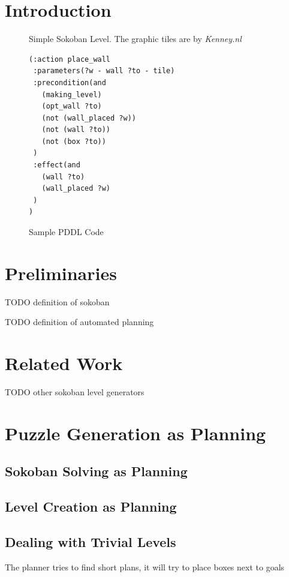 \documentclass[runningheads]{llncs}
\begin{document}
\section{Introduction}

\begin{figure}
\centering
\w\w\w\w\w\w\n
\w\p\e\x\g\w\n
\w\w\w\w\w\w\n
\caption{Simple Sokoban Level. The graphic tiles are by \emph{Kenney.nl}}
\end{figure}

\begin{figure}
\centering
\begin{verbatim}
(:action place_wall
 :parameters(?w - wall ?to - tile)
 :precondition(and
   (making_level)
   (opt_wall ?to)
   (not (wall_placed ?w))
   (not (wall ?to))
   (not (box ?to))
 )
 :effect(and
   (wall ?to)
   (wall_placed ?w)
 )
)

\end{verbatim}
\caption{Sample PDDL Code}
\end{figure}



\section{Preliminaries}
TODO definition of sokoban

TODO definition of automated planning

\section{Related Work}
TODO other sokoban level generators

\section{Puzzle Generation as Planning}

\subsection{Sokoban Solving as Planning}

\subsection{Level Creation as Planning}

\subsection{Dealing with Trivial Levels}
The planner tries to find short plans, it will try to place boxes next to goals
\end{document}
